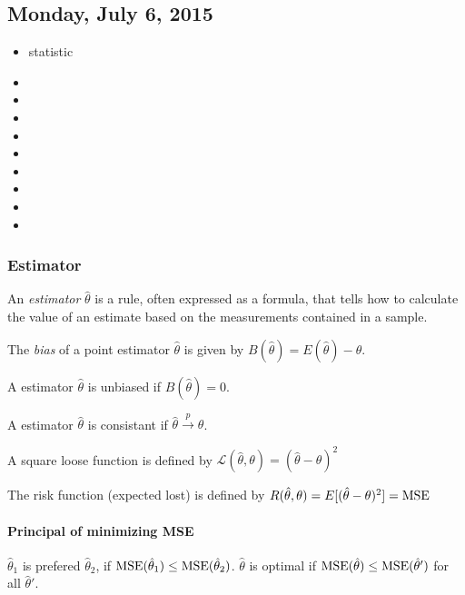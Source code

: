 \subsection{Monday, July 6, 2015}

\begin{itemize}
\item statistic
\item {}
\item {}
\item {}
\item {}
\item {}
\item {}
\item {}
\item {}
\item {}
\end{itemize}

\hrulefill


\subsubsection{Estimator}

An \textit{estimator} $\hat{\theta}$ is a rule, often expressed as a formula, that tells how to calculate the value of an estimate based on the measurements contained in a sample.

The \textit{bias} of a point estimator $\hat{\theta}$ is given by $B(\hat{\theta}) = E(\hat{\theta})-\theta$.

A estimator $\hat{\theta}$ is unbiased if $B(\hat{\theta}) = 0$.

A estimator $\hat{\theta}$ is consistant if $\hat{\theta} \xrightarrow{p} \theta$.

A square loose function is defined by $\mathcal{L}(\hat{\theta}, \theta)=(\hat{\theta}-\theta)^2$

The risk function (expected lost) is defined by $R(\hat{\theta}, \theta)=E[(\hat{\theta}-\theta)^2]=\mathrm{MSE}$

\paragraph{Principal of minimizing MSE}
$\hat\theta_1$ is prefered $\hat\theta_2$, if $\mathrm{MSE}(\hat\theta_1)\leq\mathrm{MSE}(\hat\theta_2)$.
$\hat\theta$ is optimal if $\mathrm{MSE}(\hat\theta)\leq\mathrm{MSE}(\hat\theta')$ for all $\hat\theta'$. 


